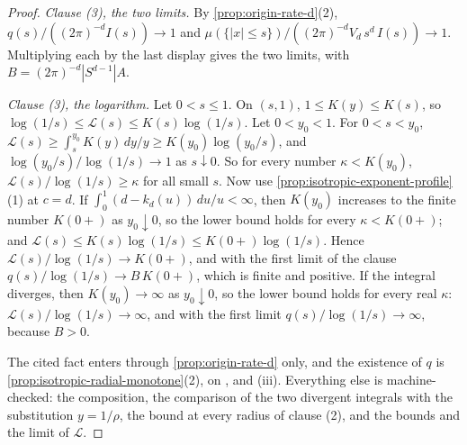 \begin{proof}
\emph{Clause (3), the two limits.} By \ref{prop:origin-rate-d}(2),
$q(s)/((2\pi)^{-d}I(s)) \to 1$ and $\mu(\{|x| \le s\})/((2\pi)^{-d}V_d\,s^{d}\,I(s)) \to 1$.
Multiplying each by the last display gives the two limits, with
$B = (2\pi)^{-d}|S^{d-1}|A$.

\emph{Clause (3), the logarithm.} Let $0 < s \le 1$. On $(s,1)$, $1 \le K(y) \le K(s)$, so
$\log(1/s) \le \mathcal{L}(s) \le K(s)\log(1/s)$. Let $0 < y_0 < 1$. For $0 < s < y_0$,
$\mathcal{L}(s) \ge \int_s^{y_0}K(y)\,dy/y \ge K(y_0)\log(y_0/s)$, and
$\log(y_0/s)/\log(1/s) \to 1$ as $s \downarrow 0$. So for every number $\kappa < K(y_0)$,
$\mathcal{L}(s)/\log(1/s) \ge \kappa$ for all small $s$. Now use
\ref{prop:isotropic-exponent-profile}(1) at $c = d$. If $\int_0^1(d - k_d(u))\,du/u < \infty$,
then $K(y_0)$ increases to the finite number $K(0{+})$ as $y_0 \downarrow 0$, so the lower bound
holds for every $\kappa < K(0{+})$; and $\mathcal{L}(s) \le K(s)\log(1/s) \le K(0{+})\log(1/s)$.
Hence $\mathcal{L}(s)/\log(1/s) \to K(0{+})$, and with the first limit of the clause
$q(s)/\log(1/s) \to B\,K(0{+})$, which is finite and positive. If the integral diverges, then
$K(y_0) \to \infty$ as $y_0 \downarrow 0$, so the lower bound holds for every real $\kappa$:
$\mathcal{L}(s)/\log(1/s) \to \infty$, and with the first limit $q(s)/\log(1/s) \to \infty$,
because $B > 0$.

The cited fact  enters through \ref{prop:origin-rate-d} only, and the existence of
$q$ is \ref{prop:isotropic-radial-monotone}(2), on ,  and
(iii). Everything else is machine-checked: the composition, the comparison of
the two divergent integrals with the substitution $y = 1/\rho$, the bound at every radius of
clause (2), and the bounds and the limit of $\mathcal{L}$.
\end{proof}

